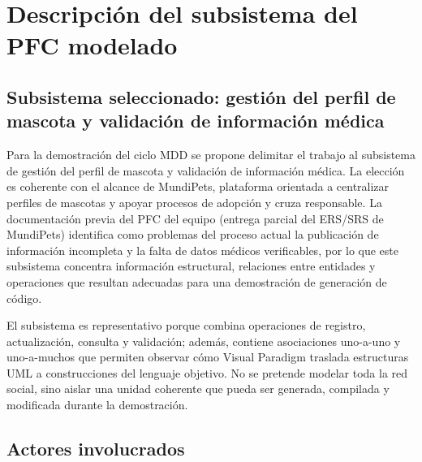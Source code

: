 \documentclass[journal,onecolumn]{IEEEtran}
\begin{document}
	\section{Descripción del subsistema del PFC modelado}
	
	\subsection{Subsistema seleccionado: gestión del perfil de mascota y validación de información médica}
	
	Para la demostración del ciclo MDD se propone delimitar el trabajo al subsistema de gestión del perfil de mascota y validación de información médica. La elección es coherente con el alcance de MundiPets, plataforma orientada a centralizar perfiles de mascotas y apoyar procesos de adopción y cruza responsable. La documentación previa del PFC del equipo (entrega parcial del ERS/SRS de MundiPets) identifica como problemas del proceso actual la publicación de información incompleta y la falta de datos médicos verificables, por lo que este subsistema concentra información estructural, relaciones entre entidades y operaciones que resultan adecuadas para una demostración de generación de código.
	
	El subsistema es representativo porque combina operaciones de registro, actualización, consulta y validación; además, contiene asociaciones uno-a-uno y uno-a-muchos que permiten observar cómo Visual Paradigm traslada estructuras UML a construcciones del lenguaje objetivo. No se pretende modelar toda la red social, sino aislar una unidad coherente que pueda ser generada, compilada y modificada durante la demostración.
	
	\subsection{Actores involucrados}
	
\end{document}
